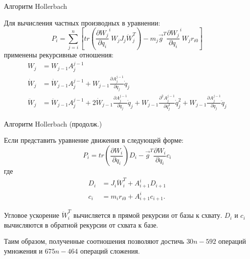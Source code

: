 \documentclass[newPxFont,numfooter,sectionpages]{beamer}
\begin{document}
\begin{frame}{Алгоритм Hollerbach}

Для вычисления частных производных в уравнении:
\begin{equation*}
\label{eq6}
P_i = 
\sum_{j=i}^{n}
\left[
tr(
\frac{\partial W_j}{\partial q_i} ^i W_j J_j \ddot W_j^T
)
- m_j \vec g^T \frac{\partial W_j}{\partial q_i} ^i W_j r_{i0}
\right]
\end{equation*} 
применены рекурсивные отношения:
\begin{align*}
W_j &= W_{j-1} A_j^{j-1}\\
\dot W_j &= \dot W_{j-1} A_j^{j-1} + W_{j-1} \frac{\partial A_j^{j-1}}{\partial q_j} \dot q_j\\
\ddot W_j &= \ddot W_{j-1} A_j^{j-1} + 2 \dot W_{j-1}
\frac{\partial A_j^{j-1}}{\partial q_j} \dot q_j +
W_{j-1} \frac{\partial^2 A_j^{j-1}}{\partial q_j^2} \dot q_j^2 +
W_{j-1} \frac{\partial A_j^{j-1}}{\partial q_j} \ddot q_j 
\end{align*}

\end{frame}

\begin{frame}{Алгоритм Hollerbach (продолж.)}
	
Если представить уравнение движения в следующей форме:
\begin{equation*}
P_i = tr(\frac{\partial W_i}{\partial q_i}) D_i -
\vec{g}^T \frac{\partial W_i}{\partial q_i} c_i
\end{equation*}
где 
\begin{align*}
D_i &= J_i \ddot W_i^T + A_{i+1}^{i} D_{i+1}\\
c_i &= m_i r_{i0} + A_{i+1}^{i} c_{i+1}.
\end{align*}

Угловое ускорение $\ddot W_i^T$ вычисляется в прямой рекурсии от базы к схвату. $D_i$ и $c_i$ вычисляются в обратной рекурсии от схвата к базе.

Таим образом, полученные соотношения позволяют достичь $30n-592$ операций умножения и $675n - 464$ операций сложения.
\end{frame}

\end{document}
